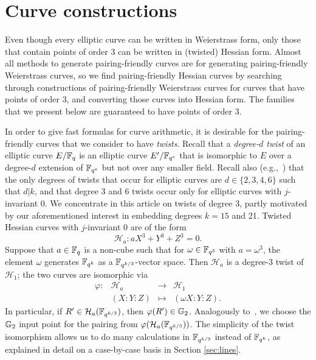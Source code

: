 \section{Curve constructions}
\label{sec:curves}

Even though every elliptic curve can be written in Weierstrass form,
only those that contain points of order 3 can be written in (twisted) Hessian form.
Almost all methods to generate pairing-friendly curves are for generating
pairing-friendly Weierstrass curves, 
so we find pairing-friendly Hessian curves by
searching through constructions of pairing-friendly Weierstrass curves for curves that have points of order 3,
and converting those curves into Hessian form.
The families that we present below are guaranteed to have points of order 3.

In order to give fast formulas for curve arithmetic, it is desirable for the pairing-friendly curves that we consider to have \emph{twists}.
Recall that a \emph{degree-$d$ twist} of an elliptic curve $E/\mathbb{F}_{q}$ is an elliptic curve $E'/\mathbb{F}_{q^e}$ that is
isomorphic to $E$ over a degree-$d$ extension of $\mathbb{F}_{q^e}$ but not over any smaller field.
Recall also (e.g.,~\cite{2009/silverman-arithmetic}) that the only degrees of twists that occur for elliptic curves are $d \in \{2,3,4,6\}$ such that $d|k$, and that degree 3 and 6 twists occur only for elliptic curves with $j$-invariant 0.
We concentrate in this article on twists of degree 3, partly motivated by our aforementioned interest in embedding degrees $k = 15$ and 21.
Twisted Hessian curves with $j$-invariant 0 are of the form
\[\mathcal{H}_a: aX^3 + Y^3 + Z^3 = 0.\]
Suppose that $a \in \mathbb{F}_{q}$ is a non-cube such that
for $\omega \in \mathbb{F}_{q^3}$ with $a = \omega^3$, the element
$\omega$ generates $\mathbb{F}_{q^k}$ as a $\mathbb{F}_{q^{k/3}}$-vector space.
Then $\mathcal{H}_{a}$ is a degree-3 twist of $\mathcal{H}_1$; the two curves are isomorphic via
\begin{equation}\label{twistiso}
\begin{array}{rccc}
\varphi: & \mathcal{H}_{a} & \rightarrow & \mathcal{H}_1 \\
& (X:Y:Z) & \mapsto & (\omega X:Y:Z).
\end{array}
\end{equation}
In particular, if $R' \in \mathcal{H}_{a}(\mathbb{F}_{q^{k/3}})$, then
$\varphi(R') \in \mathbb{G}_{2}$.
Analogously to~\cite{2003/bls}, we choose the $\mathbb{G}_{2}$ input point for the pairing
from $\varphi(\mathcal{H}_{a}(\mathbb{F}_{q^{k/3}}))$.
The simplicity of the twist isomorphism 
allows us to do many calculations in $\mathbb{F}_{q^{k/3}}$ instead of $\mathbb{F}_{q^k}$,
as explained in detail on a case-by-case basis in Section \ref{sec:lines}.

